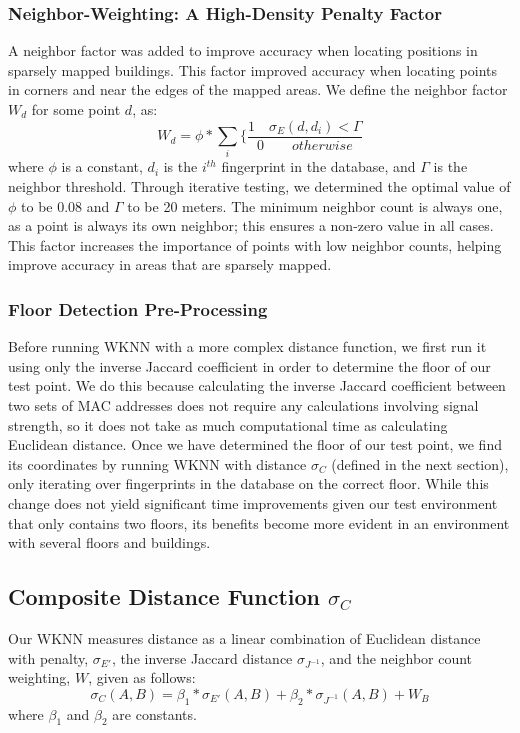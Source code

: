 \documentclass[twoside]{article}
\begin{document}
\begin{multicols}{2}
\subsubsection{Neighbor-Weighting: A High-Density Penalty Factor}
\indent A neighbor factor was added to improve accuracy when locating positions in sparsely mapped buildings. This factor improved accuracy when locating points in corners and near the edges of the mapped areas. We define the neighbor factor $W_d$ for some point $d$, as:
\begin{equation}
\label{density}
W_d=\phi*\sum\limits_{i}\{\frac{1\quad \sigma_E(d, d_i) < \Gamma}{0\quad\quad otherwise}
\end{equation}
\indent where $\phi$ is a constant, $d_i$ is the $i^{th}$ fingerprint in the database, and $\Gamma$ is the neighbor threshold. Through iterative testing, we determined the optimal value of $\phi$ to be 0.08 and $\Gamma$ to be 20 meters. The minimum neighbor count is always one, as a point is always its own neighbor; this ensures a non-zero value in all cases. This factor increases the importance of points with low neighbor counts, helping improve accuracy in areas that are sparsely mapped. 

\subsubsection{Floor Detection Pre-Processing}
\indent Before running WKNN with a more complex distance function, we first run it using only the inverse Jaccard coefficient in order to determine the floor of our test point. We do this because calculating the inverse Jaccard coefficient between two sets of MAC addresses does not require any calculations involving signal strength, so it does not take as much computational time as calculating Euclidean distance. Once we have determined the floor of our test point, we find its coordinates by running WKNN with distance $\sigma_C$ (defined in the next section), only iterating over fingerprints in the database on the correct floor. While this change does not yield significant time improvements given our test environment that only contains two floors, its benefits become more evident in an environment with several floors and buildings.
	
\subsection{Composite Distance Function $\sigma_C$}
\indent Our WKNN measures distance as a linear combination of Euclidean distance with penalty, $\sigma_{E'}$,  the inverse Jaccard distance $\sigma_{J^{-1}}$, and the neighbor count weighting, $W$,  given as follows:
\begin{equation}
\label{composite}
\sigma_C(A, B)=\beta_1*\sigma_{E'}(A, B)+\beta_2*\sigma_{J^{-1}}(A, B)+W_B
\end{equation}
\indent where $\beta_1$ and $\beta_2$ are constants. 


\end{multicols}
\end{document}

